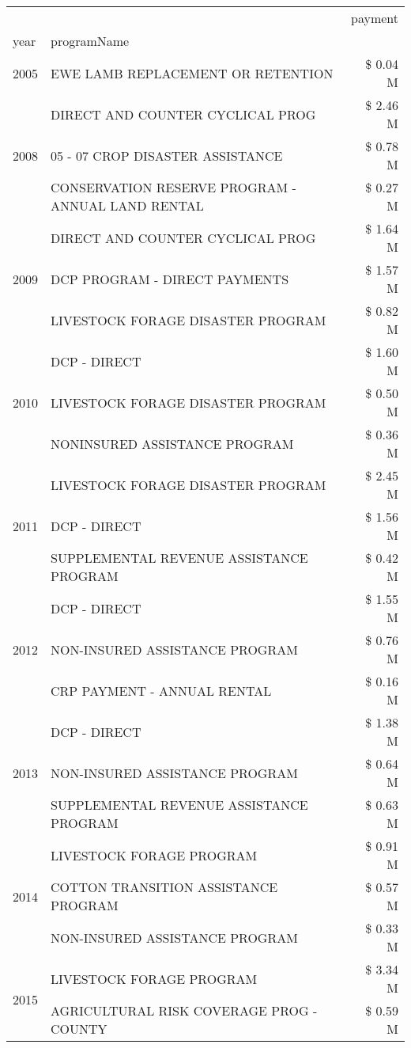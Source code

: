 \begin{tabular}{llr}
\toprule
 &  & payment \\
year & programName &  \\
\midrule
2005 & EWE LAMB REPLACEMENT OR RETENTION & \$ 0.04 M \\
\cline{1-3}
\multirow[t]{3}{*}{2008} & DIRECT AND COUNTER CYCLICAL PROG & \$ 2.46 M \\
 & 05 - 07 CROP DISASTER ASSISTANCE & \$ 0.78 M \\
 & CONSERVATION RESERVE PROGRAM - ANNUAL LAND RENTAL & \$ 0.27 M \\
\cline{1-3}
\multirow[t]{3}{*}{2009} & DIRECT AND COUNTER CYCLICAL PROG & \$ 1.64 M \\
 & DCP PROGRAM - DIRECT PAYMENTS & \$ 1.57 M \\
 & LIVESTOCK FORAGE DISASTER  PROGRAM & \$ 0.82 M \\
\cline{1-3}
\multirow[t]{3}{*}{2010} & DCP - DIRECT & \$ 1.60 M \\
 & LIVESTOCK FORAGE DISASTER PROGRAM & \$ 0.50 M \\
 & NONINSURED ASSISTANCE PROGRAM & \$ 0.36 M \\
\cline{1-3}
\multirow[t]{3}{*}{2011} & LIVESTOCK FORAGE DISASTER PROGRAM & \$ 2.45 M \\
 & DCP - DIRECT & \$ 1.56 M \\
 & SUPPLEMENTAL REVENUE ASSISTANCE PROGRAM & \$ 0.42 M \\
\cline{1-3}
\multirow[t]{3}{*}{2012} & DCP - DIRECT & \$ 1.55 M \\
 & NON-INSURED ASSISTANCE PROGRAM & \$ 0.76 M \\
 & CRP PAYMENT - ANNUAL RENTAL & \$ 0.16 M \\
\cline{1-3}
\multirow[t]{3}{*}{2013} & DCP - DIRECT & \$ 1.38 M \\
 & NON-INSURED ASSISTANCE PROGRAM & \$ 0.64 M \\
 & SUPPLEMENTAL REVENUE ASSISTANCE PROGRAM & \$ 0.63 M \\
\cline{1-3}
\multirow[t]{3}{*}{2014} & LIVESTOCK FORAGE PROGRAM & \$ 0.91 M \\
 & COTTON TRANSITION ASSISTANCE PROGRAM & \$ 0.57 M \\
 & NON-INSURED ASSISTANCE PROGRAM & \$ 0.33 M \\
\cline{1-3}
\multirow[t]{3}{*}{2015} & LIVESTOCK FORAGE PROGRAM & \$ 3.34 M \\
 & AGRICULTURAL RISK COVERAGE PROG - COUNTY & \$ 0.59 M \\

\end{tabular}
